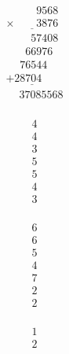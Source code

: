 \begin{minipage}[t]{0.05\linewidth}
\begin{align*}\begin{array}{c}
\textvisiblespace
\\
\textvisiblespace
\end{array}\end{align*}
\end{minipage}
\begin{minipage}[t]{0.3\linewidth}
\begin{align*}\begin{array}{c}
\phantom{
\times0000
}
9568\\
\underline{
\times
\phantom{
0000
}
3876
}\\
\phantom{
+000
}
57408
\\
\phantom{
+00
}
66976
\phantom0\\
\phantom{
+0
}
76544
\phantom0\phantom0\\
\underline{
+
28704
\phantom0\phantom0\phantom0
}
\\
\phantom{+}
37085568
\end{array}\end{align*}
\end{minipage}
\begin{minipage}[t]{0.05\linewidth}
\begin{align*}\begin{array}{c}
4
\\
4
\\
3
\\
5
\\
5
\\
4
\\
3
\end{array}\end{align*}
\end{minipage}
\begin{minipage}[t]{0.05\linewidth}
\begin{align*}\begin{array}{c}
6
\\
6
\\
5
\\
4
\\
7
\\
2
\\
2
\end{array}\end{align*}
\end{minipage}
\begin{minipage}[t]{0.05\linewidth}
\begin{align*}\begin{array}{c}
1
\\
2
\end{array}\end{align*}
\end{minipage}

